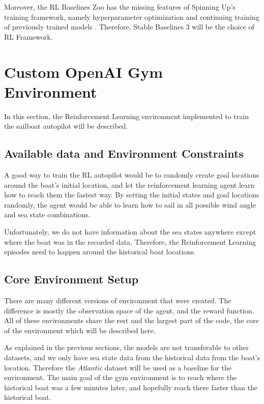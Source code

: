 \documentclass[12pt,twoside]{report}
\begin{document}
Moreover, the RL Baselines Zoo has the missing features of Spinning Up's training framework, namely hyperparameter optimization and continuing training of previously trained models \cite{rl-zoo3}. Therefore, Stable Baselines 3 will be the choice of RL Framework.

\section{Custom OpenAI Gym Environment}
In this section, the Reinforcement Learning environment implemented to train the sailboat autopilot will be described.

\subsection{Available data and Environment Constraints}
A good way to train the RL autopilot would be to randomly create goal locations around the boat's initial location, and let the reinforcement learning agent learn how to reach them the fastest way. By setting the initial states and goal locations randomly, the agent would be able to learn how to sail in all possible wind angle and sea state combinations.

Unfortunately, we do not have information about the sea states anywhere except where the boat was in the recorded data. Therefore, the Reinforcement Learning episodes need to happen around the historical boat locations.

\subsection{Core Environment Setup}
There are many different versions of environment that were created. The difference is mostly the observation space of the agent, and the reward function. All of these environments share the rest and the largest part of the code, the core of the environment which will be described here.

As explained in the previous sections, the models are not transferable to other datasets, and we only have sea state data from the historical data from the boat's location. Therefore the \textit{Atlantic} dataset will be used as a baseline for the environment. The main goal of the gym environment is to reach where the historical boat was a few minutes later, and hopefully reach there faster than the historical boat.
\end{document}
